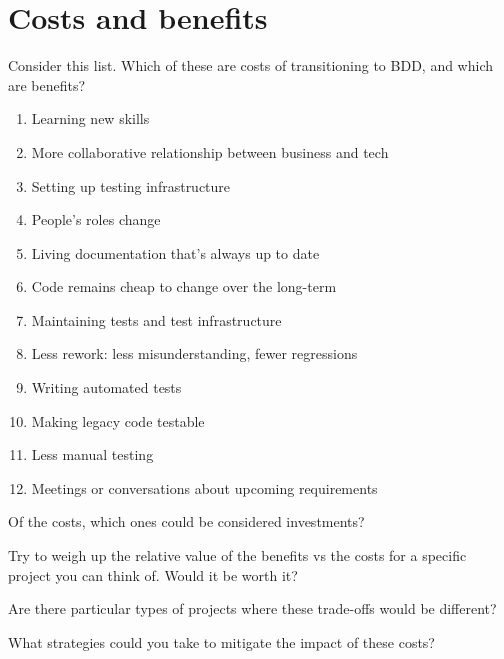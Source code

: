 \chapter*{Costs and benefits}

Consider this list. Which of these are costs of transitioning to BDD, and which are benefits?

\begin{enumerate}
\item Learning new skills
\item More collaborative relationship between business and tech
\item Setting up testing infrastructure
\item People's roles change
\item Living documentation that’s always up to date
\item Code remains cheap to change over the long-term
\item Maintaining tests and test infrastructure
\item Less rework: less misunderstanding, fewer regressions
\item Writing automated tests
\item Making legacy code testable
\item Less manual testing
\item Meetings or conversations about upcoming requirements
\end{enumerate}

\vspace{0.5cm}

Of the costs, which ones could be considered investments?


Try to weigh up the relative value of the benefits vs the costs for a specific project you can think of. Would it be worth it?


Are there particular types of projects where these trade-offs would be different?


What strategies could you take to mitigate the impact of these costs?

